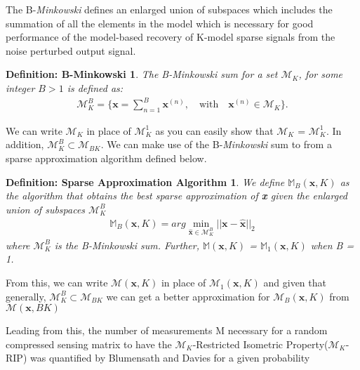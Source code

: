 \documentclass[titlepage,oneside, 12pt]{book}
\theoremstyle{break}
\begin{document}
The B-\emph{Minkowski} defines an enlarged union of subspaces which includes the summation of all the elements in the model which is necessary for good performance of the model-based recovery of K-model sparse signals  from the noise perturbed output signal. 

\newpage 
\newtheorem*{MINK}{Definition: B-Minkowski}
\begin{MINK}
The B-Minkowski sum for a set $\mathcal{M}_{K}$, for some integer $B > 1$ is defined as:
\begin{equation}
\begin{gathered}
\mathcal{M}^B_K = \bigg\{ \textbf{x} = \sum_{n = 1}^{B} \textbf{x}^{(n)}, \quad \text{with} \quad \textbf{x}^{(n)} \in \mathcal{M}_{K}\bigg\}.
\end{gathered}
\label{eqn:Mink}
\end{equation}
\end{MINK}
We can write $\mathcal{M}_K$ in place of $\mathcal{M}^1_K$ as you can easily show that $\mathcal{M}_K$ = $\mathcal{M}^1_K$. In addition, $\mathcal{M}^B_K \subset \mathcal{M}_{BK}$. We can make use of the B-\emph{Minkowski} sum to from a sparse approximation algorithm defined below. 

\newtheorem*{SAA}{Definition: Sparse Approximation Algorithm}
\begin{SAA}
We define $\mathbb{M}_{B}(\textbf{x},K)$ as the algorithm that obtains the best sparse approximation of \textbf{x} given the enlarged union of subspaces $\mathcal{M}_{K}^{B}$
\begin{equation}
\begin{gathered}
\mathbb{M}_{B}(\textbf{x},K) = arg \underset{\hat{\textbf{x}} \in \mathcal{M}^B_K}\min||\textbf{x} - \hat{\textbf{x}}||_2
\end{gathered}
\label{eqn:SAA}
\end{equation}
where $\mathcal{M}^B_K$ is the B-Minkowski sum. Further, $\mathbb{M}(\textbf{x},K)$ = $\mathbb{M}_{1}(\textbf{x},K)$ when B = 1.
\end{SAA}

From this, we can write $\mathcal{M}(\textbf{x},K)$ in place of $\mathcal{M}_1(\textbf{x},K)$ and given that generally, $\mathcal{M}^B_K \subset \mathcal{M}_{BK}$ we can get a better approximation for $\mathcal{M}_{B}(\textbf{x},K)$ from $\mathcal{M}(\textbf{x},BK)$


Leading from this, the number of measurements M necessary for a random compressed sensing matrix to have the $\mathcal{M}_{K}$-Restricted Isometric Property($\mathcal{M}_{K}$-RIP) was quantified by Blumensath and Davies for a given probability\cite{B&D}
\end{document}
